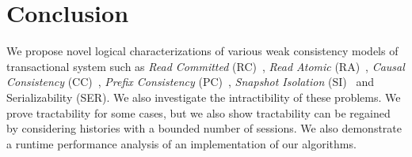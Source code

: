 \section{Conclusion}
\label{sec:txn:conclusion}

We propose novel logical characterizations of various weak consistency models of transactional system such as \emph{Read Committed} (RC)~\cite{DBLP:conf/sigmod/BerensonBGMOO95}, \emph{Read Atomic} (RA)~\cite{DBLP:conf/concur/Cerone0G15},  \emph{Causal Consistency} (CC)~\cite{DBLP:journals/cacm/Lamport78}, \emph{Prefix Consistency} (PC)~\cite{DBLP:conf/ecoop/BurckhardtLPF15}, \emph{Snapshot Isolation} (SI)~\cite{DBLP:conf/sigmod/BerensonBGMOO95} and Serializability (SER). We also investigate the intractibility of these problems. We prove tractability for some cases, but we also show tractability can be regained by considering histories with a bounded number of sessions. We also demonstrate a runtime performance analysis of an implementation of our algorithms.